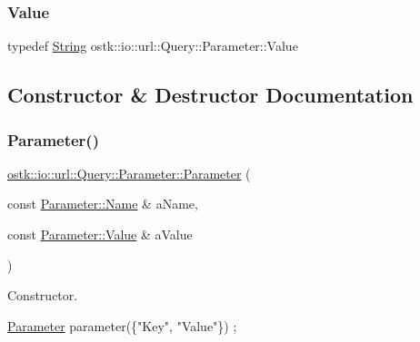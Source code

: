 \mbox{\label{classostk_1_1io_1_1url_1_1_query_1_1_parameter_ada177e3a9d839a7900aae8a718207bbd}} 
\subsubsection{\texorpdfstring{Value}{Value}}
{\footnotesize\ttfamily typedef \hyperlink{namespaceostk_1_1io_a95d49b120613a7610cb1b4f03b1116b6}{String} ostk\+::io\+::url\+::\+Query\+::\+Parameter\+::\+Value}



\subsection{Constructor \& Destructor Documentation}
\mbox{\label{classostk_1_1io_1_1url_1_1_query_1_1_parameter_a0206a88a6546df8ec49219db4a8db3f3}} 
\subsubsection{\texorpdfstring{Parameter()}{Parameter()}}
{\footnotesize\ttfamily \hyperlink{classostk_1_1io_1_1url_1_1_query_1_1_parameter}{ostk\+::io\+::url\+::\+Query\+::\+Parameter\+::\+Parameter} (\begin{DoxyParamCaption}\item[{const \hyperlink{classostk_1_1io_1_1url_1_1_query_1_1_parameter_ad176899a3555e0d0efeb0c13f73a8a80}{Parameter\+::\+Name} \&}]{a\+Name,  }\item[{const \hyperlink{classostk_1_1io_1_1url_1_1_query_1_1_parameter_ada177e3a9d839a7900aae8a718207bbd}{Parameter\+::\+Value} \&}]{a\+Value }\end{DoxyParamCaption})}



Constructor. 


\begin{DoxyCode}
\hyperlink{classostk_1_1io_1_1url_1_1_query_1_1_parameter_a0206a88a6546df8ec49219db4a8db3f3}{Parameter} parameter(\{\textcolor{stringliteral}{"Key"}, \textcolor{stringliteral}{"Value"}\}) ;
\end{DoxyCode}



